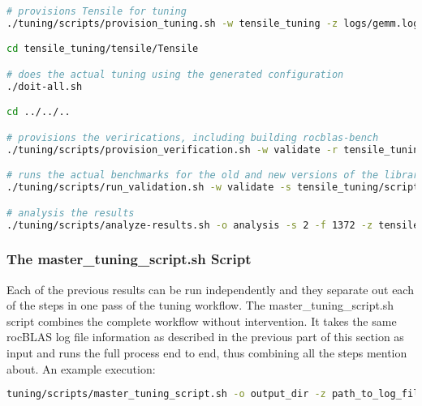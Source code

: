 \documentclass[]{article}
\begin{document}
\begin{lstlisting}[language=bash,breaklines=true]
# provisions Tensile for tuning
./tuning/scripts/provision_tuning.sh -w tensile_tuning -z logs/gemm.log -o tf_inception.yaml -y sgemm -l vega20 

cd tensile_tuning/tensile/Tensile

# does the actual tuning using the generated configuration
./doit-all.sh

cd ../../..

# provisions the verirications, including building rocblas-bench
./tuning/scripts/provision_verification.sh -w validate -r tensile_tuning/tensile/Tensile -l vega20

# runs the actual benchmarks for the old and new versions of the library
./tuning/scripts/run_validation.sh -w validate -s tensile_tuning/scripts

# analysis the results
./tuning/scripts/analyze-results.sh -o analysis -s 2 -f 1372 -z tensile_tuning/scripts/*-all.sh -r validate/rocblas/rocBLAS-reference/build/release/clients/staging/results1 -b validate/rocblas/rocBLAS-reference/build/release/clients/staging/results2
\end{lstlisting}

\subsubsection{The master\_tuning\_script.sh Script}

Each of the previous results can be run independently and they separate out each of the steps in one pass of the tuning workflow. The master\_tuning\_script.sh script combines the complete workflow without intervention. It takes the same rocBLAS log file information as described in the previous part of this section as input and runs the full process end to end, thus combining all the steps mention about. An example execution:

\begin{lstlisting}[language=bash,breaklines=true]
tuning/scripts/master_tuning_script.sh -o output_dir -z path_to_log_file
\end{lstlisting}
\end{document}
